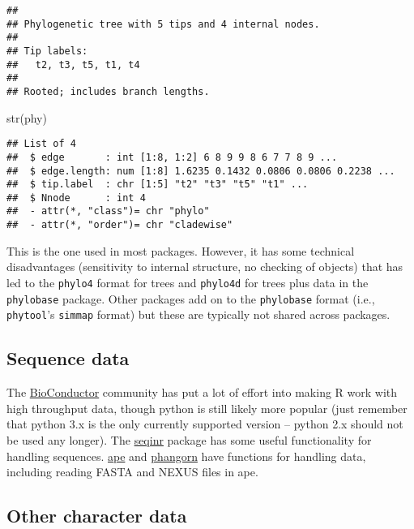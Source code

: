 \documentclass[
]{article}
\newenvironment{Shaded}{\begin{snugshade}}{\end{snugshade}}
\newcommand{\FunctionTok}[1]{\textcolor[rgb]{0.00,0.00,0.00}{#1}}
\newcommand{\NormalTok}[1]{#1}
\begin{document}
\begin{verbatim}
## 
## Phylogenetic tree with 5 tips and 4 internal nodes.
## 
## Tip labels:
##   t2, t3, t5, t1, t4
## 
## Rooted; includes branch lengths.
\end{verbatim}

\begin{Shaded}
\begin{Highlighting}[]
\FunctionTok{str}\NormalTok{(phy)}
\end{Highlighting}
\end{Shaded}

\begin{verbatim}
## List of 4
##  $ edge       : int [1:8, 1:2] 6 8 9 9 8 6 7 7 8 9 ...
##  $ edge.length: num [1:8] 1.6235 0.1432 0.0806 0.0806 0.2238 ...
##  $ tip.label  : chr [1:5] "t2" "t3" "t5" "t1" ...
##  $ Nnode      : int 4
##  - attr(*, "class")= chr "phylo"
##  - attr(*, "order")= chr "cladewise"
\end{verbatim}

This is the one used in most packages. However, it has some technical disadvantages (sensitivity to internal structure, no checking of objects) that has led to the \texttt{phylo4} format for trees and \texttt{phylo4d} for trees plus data in the \texttt{phylobase} package. Other packages add on to the \texttt{phylobase} format (i.e., \texttt{phytool}'s \texttt{simmap} format) but these are typically not shared across packages.

\hypertarget{sequence-data}{%
\subsection{Sequence data}\label{sequence-data}}

The \href{https://www.bioconductor.org/}{BioConductor} community has put a lot of effort into making R work with high throughput data, though python is still likely more popular (just remember that python 3.x is the only currently supported version -- python 2.x should not be used any longer). The \href{http://seqinr.r-forge.r-project.org/}{seqinr} package has some useful functionality for handling sequences. \href{https://www.rdocumentation.org/packages/ape/}{ape} and \href{https://github.com/KlausVigo/phangorn}{phangorn} have functions for handling data, including reading FASTA and NEXUS files in ape.

\hypertarget{other-character-data}{%
\subsection{Other character data}\label{other-character-data}}
\end{document}
